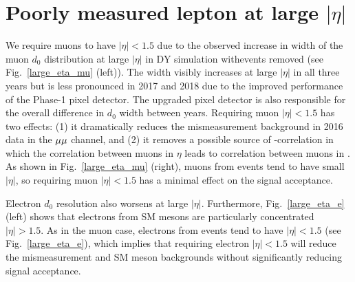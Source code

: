 \chapter{Poorly measured lepton \ad at large $|\eta|$}
\label{large_eta}

We require muons to have $|\eta|<1.5$ due to the observed increase in width of the muon $d_0$ distribution at large $|\eta|$ in DY simulation with\ztautaull events removed (see Fig.~\ref{large_eta_mu} (left)). The width visibly increases at large $|\eta|$ in all three years but is less pronounced in 2017 and 2018 due to the improved performance of the Phase-1 pixel detector. The upgraded pixel detector is also responsible for the overall difference in $d_0$ width between years. Requiring muon $|\eta|< 1.5$ has two effects: (1) it dramatically reduces the mismeasurement background in 2016 data in the ${\mu}{\mu}$ channel, and (2) it removes a possible source of \ada-\adb correlation in which the correlation between muons in $\eta$ leads to correlation between muons in \ad. As shown in Fig.~\ref{large_eta_mu} (right), muons from \stoptolb events tend to have small $|\eta|$, so requiring muon $|\eta|< 1.5$ has a minimal effect on the signal acceptance.



Electron $d_0$ resolution also worsens at large $|\eta|$. Furthermore, Fig.~\ref{large_eta_e} (left) shows that electrons from SM mesons are particularly concentrated $|\eta|>1.5$. As in the muon case, electrons from \stoptolb events tend to have $|\eta|<1.5$ (see Fig.~\ref{large_eta_e}), which implies that requiring electron $|\eta|<1.5$ will reduce the mismeasurement and SM meson backgrounds without significantly reducing signal acceptance.



\pagebreak